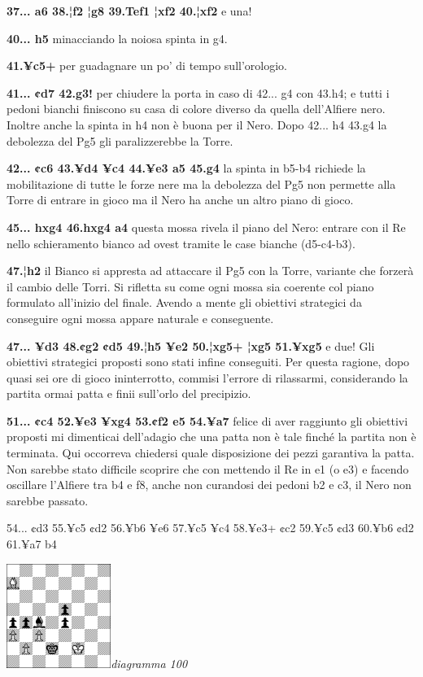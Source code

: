 \documentclass[
]{article}
\begin{document}
\textbf{37... a6 38.¦f2 ¦g8 39.Tef1 ¦xf2 40.¦xf2} e una!

\textbf{40... h5} minacciando la noiosa spinta in g4.

\textbf{41.¥c5+} per guadagnare un po' di tempo sull'orologio.

\textbf{41... ¢d7 42.g3!} per chiudere la porta in caso di 42... g4 con
43.h4; e tutti i pedoni bianchi finiscono su casa di colore diverso da
quella dell'Alfiere nero. Inoltre anche la spinta in h4 non è buona per
il Nero. Dopo 42... h4 43.g4 la debolezza del Pg5 gli paralizzerebbe la
Torre.

\textbf{42... ¢c6 43.¥d4 ¥c4 44.¥e3 a5 45.g4} la spinta in b5-b4
richiede la mobilitazione di tutte le forze nere ma la debolezza del Pg5
non permette alla Torre di entrare in gioco ma il Nero ha anche un altro
piano di gioco.

\textbf{45... hxg4 46.hxg4 a4} questa mossa rivela il piano del Nero:
entrare con il Re nello schieramento bianco ad ovest tramite le case
bianche (d5-c4-b3).

\textbf{47.¦h2} il Bianco si appresta ad attaccare il Pg5 con la Torre,
variante che forzerà il cambio delle Torri. Si rifletta su come ogni
mossa sia coerente col piano formulato all'inizio del finale. Avendo a
mente gli obiettivi strategici da conseguire ogni mossa appare naturale
e conseguente.

\textbf{47... ¥d3 48.¢g2 ¢d5 49.¦h5 ¥e2 50.¦xg5+ ¦xg5 51.¥xg5} e due!
Gli obiettivi strategici proposti sono stati infine conseguiti. Per
questa ragione, dopo quasi sei ore di gioco ininterrotto, commisi
l'errore di rilassarmi, considerando la partita ormai patta e finii
sull'orlo del precipizio.

\textbf{51... ¢c4 52.¥e3 ¥xg4 53.¢f2 e5 54.¥a7} felice di aver raggiunto
gli obiettivi proposti mi dimenticai dell'adagio che una patta non è
tale finché la partita non è terminata. Qui occorreva chiedersi quale
disposizione dei pezzi garantiva la patta. Non sarebbe stato difficile
scoprire che con mettendo il Re in e1 (o e3) e facendo oscillare
l'Alfiere tra b4 e f8, anche non curandosi dei pedoni b2 e c3, il Nero
non sarebbe passato.

54... ¢d3 55.¥c5 ¢d2 56.¥b6 ¥e6 57.¥c5 ¥c4 58.¥e3+ ¢c2 59.¥c5 ¢d3 60.¥b6
¢d2 61.¥a7 b4

\includegraphics[width=1.33472in,height=1.33472in]{vertopal_109f12be458a423d8f3cc838880eaea2/media/image100.png}\emph{diagramma
100}
\end{document}
